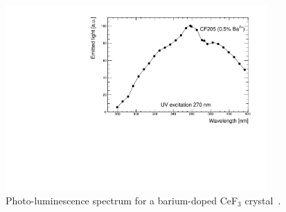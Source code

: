 \documentclass[a4paper,11pt]{article}
\begin{document}
\begin{figure}[ht]
\begin{center}
      \includegraphics[width=10cm]{Figures/SpectrumCeF3.pdf}
\caption{\small Photo-luminescence spectrum for a barium-doped CeF$_3$ crystal~\cite{r-EACEF3}.}
    \label{fig:cef3spectrum}
\end{center}
\end{figure}
\end{document}
